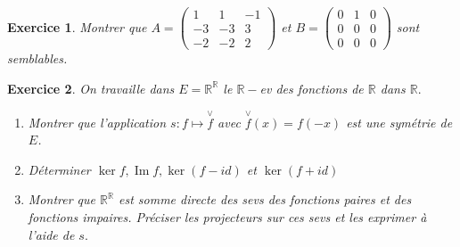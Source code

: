 \documentclass[12pt,a4paper]{article}
\newcommand{\R}{\mathbb{R}}
\DeclareMathOperator{\Ima }{Im}
\theoremstyle{break}
\theoremstyle{break}
\newtheorem{Exo}{Exercice}
\begin{document}
\begin{Exo}
	Montrer que $A=\begin{pmatrix}1 & 1 & -1 \\-3& -3 & 3 \\-2 & -2 & 2\end{pmatrix}$ et  $B=\begin{pmatrix}0 & 1& 0 \\0& 0& 0 \\0 & 0 & 0\end{pmatrix}$ sont semblables.
\end{Exo}
%

\begin{Exo}
	 On travaille dans $E=\R^{\R}$ le $\R-$ev des fonctions de $\R$ dans $\R.$

\begin{enumerate}
	\item Montrer que l'application $s:f\mapsto \overset{\vee }{f}$ avec $\overset{\vee }{f}\left( x\right) =f\left( -x\right) $ est une symétrie de $E$.
	
	\item Déterminer $\ker f,\Ima  f,\ker \left( f-id\right) $ et $\ker \left( f+id\right) $
	
	\item Montrer que $\R^{\R}$ est somme directe des sevs des fonctions paires et des fonctions impaires. Préciser les projecteurs sur ces sevs et les exprimer à l'aide de $s.$
\end{enumerate}
\end{Exo}



%
\end{document}
